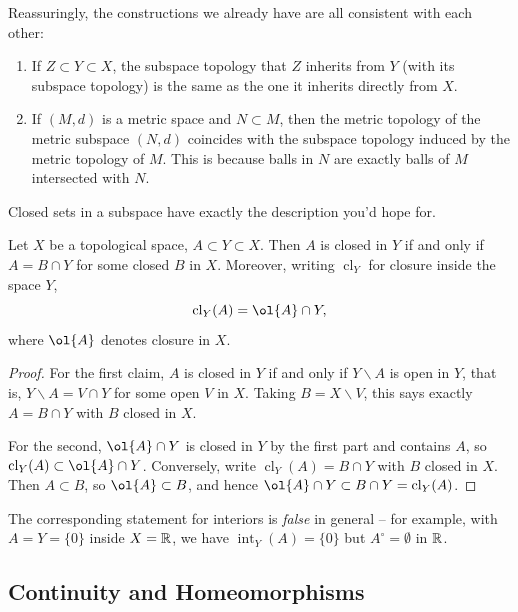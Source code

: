 \documentclass[a4paper]{scrartcl}
\begin{document}
\begin{remark}
    Reassuringly, the constructions we already have are all consistent with each other:
    \begin{enumerate}[label=(\roman*)]
        \item If $Z \subset Y \subset X$, the subspace topology that $Z$ inherits from $Y$ (with its subspace topology) is the same as the one it inherits directly from $X$.
        \item If $(M, d)$ is a metric space and $N \subset M$, then the metric topology of the metric subspace $(N, d)$ coincides with the subspace topology induced by the metric topology of $M$. This is because balls in $N$ are exactly balls of $M$ intersected with $N$.
    \end{enumerate}
\end{remark}

Closed sets in a subspace have exactly the description you'd hope for.

\begin{proposition}
    Let $X$ be a topological space, $A \subset Y \subset X$. Then $A$ is closed in $Y$ if and only if $A = B \cap Y$ for some closed $B$ in $X$. Moreover, writing $\operatorname{cl}_Y$ for closure inside the space $Y$,
    $$
    \operatorname{cl}_Y(A) = \ol{A} \cap Y,
    $$
    where $\ol{A}$ denotes closure in $X$.
\end{proposition}
\begin{proof}
    For the first claim, $A$ is closed in $Y$ if and only if $Y \backslash A$ is open in $Y$, that is, $Y \backslash A = V \cap Y$ for some open $V$ in $X$. Taking $B = X \backslash V$, this says exactly $A = B \cap Y$ with $B$ closed in $X$.

    For the second, $\ol{A} \cap Y$ is closed in $Y$ by the first part and contains $A$, so $\operatorname{cl}_Y(A) \subset \ol{A} \cap Y$. Conversely, write $\operatorname{cl}_Y(A) = B \cap Y$ with $B$ closed in $X$. Then $A \subset B$, so $\ol{A} \subset B$, and hence $\ol{A} \cap Y \subset B \cap Y = \operatorname{cl}_Y(A)$.
\end{proof}

The corresponding statement for interiors is \emph{false} in general -- for example, with $A = Y = \{0\}$ inside $X = \mathbb{R}$, we have $\operatorname{int}_Y(A) = \{0\}$ but $A^{\circ} = \emptyset$ in $\mathbb{R}$.

\subsection{Continuity and Homeomorphisms}
\end{document}
